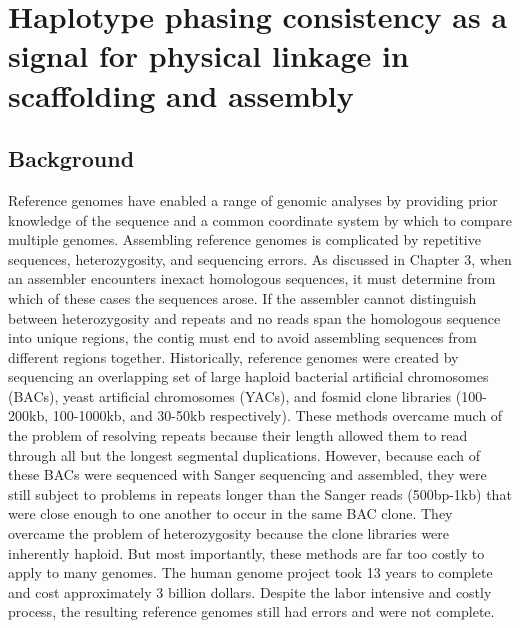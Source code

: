 %
\chapter{Haplotype phasing consistency as a signal for physical linkage in scaffolding and assembly}

\ifpdf
    \graphicspath{{Chapter4/Figs/Raster/}{Chapter4/Figs/PDF/}{Chapter4/Figs/}}
\else
    \graphicspath{{Chapter4/Figs/Vector/}{Chapter4/Figs/}}
\fi

\section{Background}
\par{
Reference genomes have enabled a range of genomic analyses by providing prior knowledge of the sequence and a common coordinate system by which to compare multiple genomes\cite{1000genomes}\cite{GRCh38}. Assembling reference genomes is complicated by repetitive sequences, heterozygosity, and sequencing errors. As discussed in Chapter 3, when an assembler encounters inexact homologous sequences, it must determine from which of these cases the sequences arose. 
If the assembler cannot distinguish between heterozygosity and repeats and no reads span the homologous sequence into unique regions, the contig must end
to avoid assembling sequences from different regions together. Historically, reference genomes were created by sequencing an overlapping set of large haploid bacterial artificial chromosomes (BACs), yeast artificial chromosomes (YACs), and fosmid clone libraries \cite{human} (100-200kb, 100-1000kb, and 30-50kb respectively). 
These methods overcame much of the problem of resolving repeats because their length allowed them to read through all but the longest segmental duplications. However, because each of these BACs were sequenced with Sanger sequencing and assembled, they were still subject to problems in repeats longer than the Sanger reads (500bp-1kb) that were close enough to one another to occur in the same BAC clone. They overcame the problem of heterozygosity because the clone libraries were inherently haploid. But most importantly, these methods are far too costly to apply to many genomes. The human genome project took 13 years to complete and cost approximately 3 billion dollars\cite{genomeproject}. Despite the labor intensive and costly process, the resulting reference genomes still had errors and were not complete\cite{renamegrch38}.
} 

